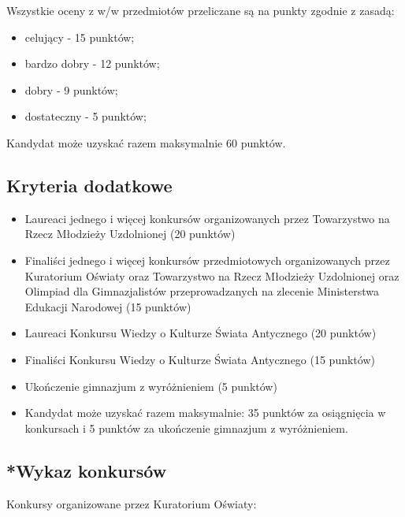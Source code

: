 \documentclass[a4paper,12pt]{scrartcl}
\begin{document}
\vspace{5mm}
Wszystkie oceny z w/w przedmiotów przeliczane są na punkty zgodnie z zasadą:

\begin{itemize}
\item celujący - 15 punktów;
\item bardzo dobry - 12 punktów;
\item dobry - 9 punktów;
\item dostateczny - 5 punktów;
\end{itemize}

Kandydat może uzyskać razem maksymalnie 60 punktów.

\subsection*{Kryteria dodatkowe}

\begin{itemize}
\item Laureaci jednego i więcej konkursów organizowanych przez Towarzystwo na Rzecz Młodzieży Uzdolnionej (20 punktów)

\item Finaliści jednego i więcej konkursów przedmiotowych organizowanych przez Kuratorium Oświaty  oraz Towarzystwo na Rzecz Młodzieży Uzdolnionej oraz Olimpiad  dla Gimnazjalistów przeprowadzanych  na zlecenie Ministerstwa Edukacji Narodowej (15 punktów)

\item Laureaci Konkursu Wiedzy o Kulturze Świata Antycznego (20 punktów)

\item Finaliści Konkursu Wiedzy o Kulturze Świata Antycznego (15 punktów)

\item Ukończenie gimnazjum z wyróżnieniem (5 punktów)

\item Kandydat może uzyskać razem maksymalnie:  35 punktów za osiągnięcia w konkursach i 5 punktów za ukończenie gimnazjum z wyróżnieniem.
\end{itemize}

\subsection*{*Wykaz konkursów}

\footnotesize
Konkursy organizowane przez Kuratorium Oświaty:
\end{document}
